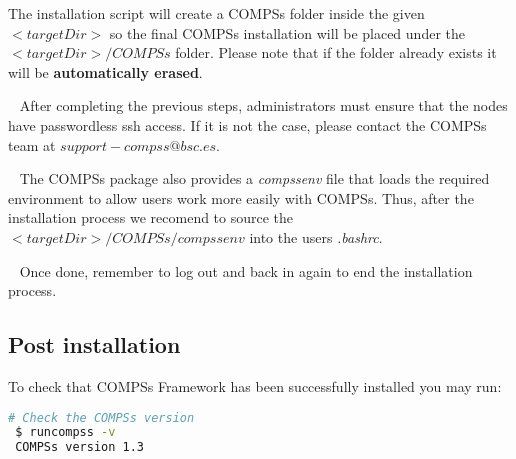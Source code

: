 The installation script will create a COMPSs folder inside the given $<targetDir>$ so the final COMPSs installation will be placed 
under the $<targetDir>/COMPSs$ folder. Please note that if the folder already exists it will be \textbf{automatically erased}.

~ \newline
After completing the previous steps, administrators must ensure that the nodes have passwordless ssh access. If it is not the case,
please contact the COMPSs team at $support-compss@bsc.es$.

~ \newline
The COMPSs package also provides a \textit{compssenv} file that loads the required environment to allow users work more easily
with COMPSs. Thus, after the installation process we recomend to source the $<targetDir>/COMPSs/compssenv$ into the 
users \textit{.bashrc}.

~ \newline
Once done, remember to log out and back in again to end the installation process.

\subsection{Post installation}
To check that COMPSs Framework has been successfully installed you may run:
\begin{lstlisting}[language=bash]
 # Check the COMPSs version
 $ runcompss -v
 COMPSs version 1.3
\end{lstlisting}

